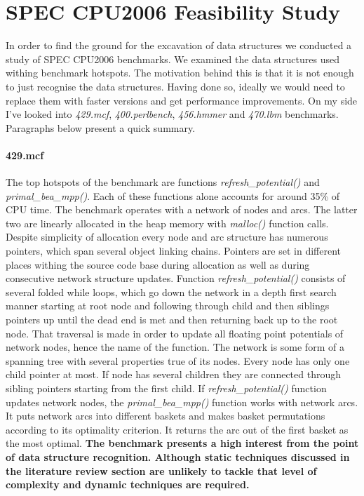 \documentclass[10pt,a4paper]{report}
\begin{document}
\section{SPEC CPU2006 Feasibility Study}
\quad In order to find the ground for the excavation of data structures we conducted a study of SPEC CPU2006 benchmarks. We examined the data structures used withing benchmark hotspots. The motivation behind this is that it is not enough to just recognise the data structures. Having done so, ideally we would need to replace them with faster versions and get performance improvements. On my side I've looked into \textit{429.mcf}, \textit{400.perlbench}, \textit{456.hmmer} and \textit{470.lbm} benchmarks. Paragraphs below present a quick summary.

\paragraph{429.mcf} The top hotspots of the benchmark are functions \textit{refresh\_potential()} and \textit{primal\_bea\_mpp()}. Each of these functions alone accounts for around 35\% of CPU time. The benchmark operates with a network of nodes and arcs. The latter two are linearly allocated in the heap memory with \textit{malloc()} function calls. Despite simplicity of allocation every node and arc structure has numerous pointers, which span several object linking chains. Pointers are set in different places withing the source code base during allocation as well as during consecutive network structure updates. Function \textit{refresh\_potential()} consists of several folded while loops, which go down the network in a depth first search manner starting at root node and following through child and then siblings pointers up until the dead end is met and then returning back up to the root node. That traversal is made in order to update all floating point potentials of network nodes, hence the name of the function. The network is some form of a spanning tree with several properties true of its nodes. Every node has only one child pointer at most. If node has several children they are connected through sibling pointers starting from the first child. If \textit{refresh\_potential()} function updates network nodes, the \textit{primal\_bea\_mpp()} function works with network arcs. It puts network arcs into different baskets and makes basket permutations according to its optimality criterion. It returns the arc out of the first basket as the most optimal.\newline\null
\quad\textbf{The benchmark presents a high interest from the point of data structure recognition. Although static techniques discussed in the literature review section are unlikely to tackle that level of complexity and dynamic techniques are required.}
\end{document}
